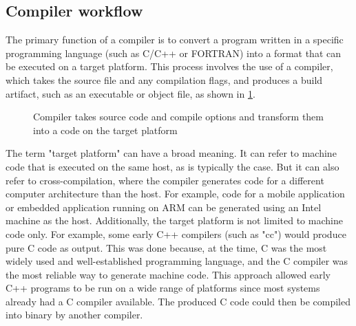 \subsection{Compiler workflow}

The primary function of a compiler is to convert a program written in a specific
programming language (such as C/C++ or FORTRAN) into a format that can be
executed on a target platform. This process involves the use of a compiler,
which takes the source file and any compilation flags, and produces a build
artifact, such as an executable or object file, as shown in
\cref{fig:compiler}. 
\begin{figure}
  \begin{center}
  \end{center}
  \caption{Compiler takes source code and compile options and transform them
    into a code on the target platform}
  \label{fig:compiler}
\end{figure}
The term "target platform" can have a broad meaning. It can refer to machine
code that is executed on the same host, as is typically the case. But it can
also refer to cross-compilation, where the compiler generates code for a
different computer architecture than the host. For example, code for a mobile
application or embedded application running on ARM can be generated using an
Intel machine as the host. Additionally, the target platform is not limited to
machine code only. For example, some early C++ compilers (such as "cc") would
produce pure C code as output. This was done because, at the time, C was the
most widely used and well-established programming language, and the C compiler
was the most reliable way to generate machine code. This approach allowed early
C++ programs to be run on a wide range of platforms since most systems already
had a C compiler available. The produced C code could then be compiled into
binary by another compiler.   

